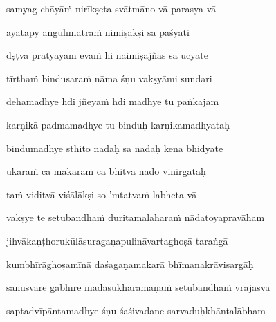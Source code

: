 samyag chāyā\.m nirīkṣeta svātmāno vā parasya vā \veg\dontdisplaylinenum

āyātapy aṅgulīmātra\.m nimiṣākṣi sa paśyati\thinspace{\dandab} \dontdisplaylinenum

dṣṭvā pratyayam eva\.m hi naimiṣajñas sa ucyate \veg\dontdisplaylinenum

tīrtha\.m bindusara\.m nāma śṇu vakṣyāmi sundari\thinspace{\dandab} \dontdisplaylinenum

dehamadhye hdi jñeya\.m hdi madhye tu paṅkajam \veg\dontdisplaylinenum

karṇikā padmamadhye tu binduḥ karṇikamadhyataḥ\thinspace{\dandab} \dontdisplaylinenum

bindumadhye sthito nādaḥ sa nādaḥ kena bhidyate \veg\dontdisplaylinenum

ukāra\.m ca makāra\.m ca bhitvā nādo vinirgataḥ\thinspace{\dandab} \dontdisplaylinenum

ta\.m viditvā viśālākṣi so 'mtatva\.m labheta vā \veg\dontdisplaylinenum

\ujvers\nemsloka 
vakṣye te setubandha\.m duritamalahara\.m nādatoyapravāham
\dontdisplaylinenum

\nemslokab 
jihvākaṇṭhorukūlāsuragaṇapulināvartaghoṣā taraṅgā \danda\dontdisplaylinenum

\nemslokac 
kumbhīrāghoṣamīnā daśagaṇamakarā bhīmanakrāvisargāḥ
\dontdisplaylinenum

\nemslokad 
sānusvāre gabhīre madasukharamaṇa\.m setubandha\.m vrajasva \veg\dontdisplaylinenum

\ujvers\nemsloka 
saptadvīpāntamadhye śṇu śaśivadane sarvaduḥkhāntalābham
\dontdisplaylinenum


